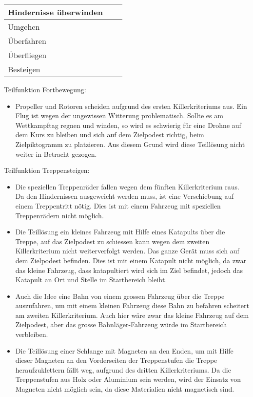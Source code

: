 \begin{longtable}[h]{l p{7cm} l}
\textbf{Hindernisse überwinden} 
\tabularnewline
\endhead
Umgehen
\tabularnewline
\cellcolor{red}Überfahren
\tabularnewline
\cellcolor{red}Überfliegen
\tabularnewline
\cellcolor{red}Besteigen
\end{longtable}

Teilfunktion Fortbewegung:
\begin{itemize}
    \item Propeller und Rotoren scheiden aufgrund des ersten Killerkriteriums aus. Ein Flug ist wegen der ungewissen Witterung problematisch. Sollte es am Wettkampftag regnen und winden, so wird es schwierig für eine Drohne auf dem Kurs zu bleiben und sich auf dem Zielpodest richtig, beim Zielpiktogramm zu platzieren. Aus diesem Grund wird diese Teillösung nicht weiter in Betracht gezogen.
 \end{itemize}

Teilfunktion Treppensteigen:
\begin{itemize}
    \item Die speziellen Treppenräder fallen wegen dem fünften Killerkriterium raus. Da den Hindernissen ausgeweicht werden muss, ist eine Verschiebung auf einem Treppentritt nötig. Dies ist mit einem Fahrzeug mit speziellen Treppenrädern nicht möglich.
    \item Die Teillösung ein kleines Fahrzeug mit Hilfe eines Katapults über die Treppe, auf das Zielpodest zu schiessen kann wegen dem zweiten Killerkriterium nicht weiterverfolgt werden. Das ganze Gerät muss sich auf dem Zielpodest befinden. Dies ist mit einem Katapult nicht möglich, da zwar das kleine Fahrzeug, dass katapultiert wird sich im Ziel befindet, jedoch das Katapult an Ort und Stelle im Startbereich bleibt.
    \item Auch die Idee eine Bahn von einem grossen Fahrzeug über die Treppe auszufahren, um mit einem kleinen Fahrzeug diese Bahn zu befahren scheitert am zweiten Killerkriterium. Auch hier wäre zwar das kleine Fahrzeug auf dem Zielpodest, aber das grosse Bahnläger-Fahrzeug würde im Startbereich verbleiben.
    \item Die Teillösung einer Schlange mit Magneten an den Enden, um mit Hilfe dieser Magneten an den Vorderseiten der Treppenstufen die Treppe heraufzuklettern fällt weg, aufgrund des dritten Killerkriteriums. Da die Treppenstufen aus Holz oder Aluminium sein werden, wird der Einsatz von Magneten nicht möglich sein, da diese Materialien nicht magnetisch sind.
\end{itemize}

